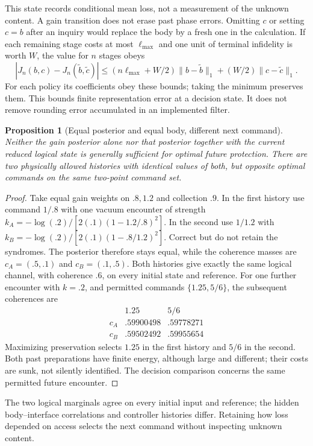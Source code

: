 \documentclass[11pt]{article}
\newtheorem{proposition}[theorem]{Proposition}
\theoremstyle{definition}
\theoremstyle{remark}
\begin{document}
This state records conditional mean loss, not a measurement of the unknown
content. A gain transition does not erase past phase errors. Omitting $c$ or
setting $c=b$ after an inquiry would replace the body by a fresh one in the
calculation. If each remaining stage costs at most $\ell_{\max}$ and one
unit of terminal infidelity is worth $W$, the value for $n$ stages obeys
\[
 |J_n(b,c)-J_n(\widetilde b,\widetilde c)|
 \le(n\ell_{\max}+W/2)\|b-\widetilde b\|_1
       +(W/2)\|c-\widetilde c\|_1.
\]
For each policy its coefficients obey these bounds; taking the minimum
preserves them. This bounds finite representation error at a decision state.
It does not remove rounding error accumulated in an implemented filter.

\begin{proposition}[Equal posterior and equal body, different next command]
\label{prop:history-hidden-damage}
Neither the gain posterior alone nor that posterior together with the current
reduced logical state is generally sufficient for optimal future protection.
There are two physically allowed histories with identical values of both,
but opposite optimal commands on the same two-point command set.
\end{proposition}
\begin{proof}
Take equal gain weights on $.8,1.2$ and collection $.9$. In the first
history use command $1/.8$ with one vacuum encounter of strength
$k_A=-\log(.2)/[2(.1)(1-1.2/.8)^2]$. In the second use $1/1.2$ with
$k_B=-\log(.2)/[2(.1)(1-.8/1.2)^2]$. Correct but do not retain the
syndromes. The posterior therefore stays equal, while the coherence masses
are $c_A=(.5,.1)$ and $c_B=(.1,.5)$. Both histories give exactly the same
logical channel, with coherence $.6$, on every initial state and reference.
For one further encounter with $k=.2$, and permitted commands
$\{1.25,5/6\}$, the subsequent coherences are
\[
\begin{array}{c|cc}
 &1.25&5/6\\\hline
 c_A&.59900498&.59778271\\
 c_B&.59502492&.59955654
\end{array}
\]
Maximizing preservation selects $1.25$ in the first history and $5/6$ in
the second. Both past preparations have finite energy, although large and
different; their costs are sunk, not silently identified. The decision
comparison concerns the same permitted future encounter.
\end{proof}

The two logical marginals agree on every initial input and reference; the hidden body--interface correlations and controller histories differ. Retaining how loss depended on access selects the next command without inspecting unknown content.
\end{document}
